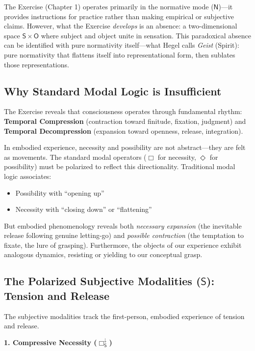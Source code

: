 \documentclass[12pt]{book}
\newcommand{\SBoxDown}{\Box_{\mathsf{S}}^{\downarrow}}
\begin{document}
The Exercise (Chapter 1) operates primarily in the normative mode ($\mathsf{N}$)---it provides instructions for practice rather than making empirical or subjective claims. However, what the Exercise \textit{develops} is an absence: a two-dimensional space $\mathsf{S} \times \mathsf{O}$ where subject and object unite in sensation. This paradoxical absence can be identified with pure normativity itself---what Hegel calls \textit{Geist} (Spirit): pure normativity that flattens itself into representational form, then sublates those representations.

\subsection{Why Standard Modal Logic is Insufficient}

The Exercise reveals that consciousness operates through fundamental rhythm: \textbf{Temporal Compression} (contraction toward finitude, fixation, judgment) and \textbf{Temporal Decompression} (expansion toward openness, release, integration).

In embodied experience, necessity and possibility are not abstract---they are felt as movements. The standard modal operators ($\Box$ for necessity, $\Diamond$ for possibility) must be polarized to reflect this directionality. Traditional modal logic associates:

\begin{itemize}
\item Possibility with ``opening up''
\item Necessity with ``closing down'' or ``flattening''
\end{itemize}

But embodied phenomenology reveals both \textit{necessary expansion} (the inevitable release following genuine letting-go) and \textit{possible contraction} (the temptation to fixate, the lure of grasping). Furthermore, the objects of our experience exhibit analogous dynamics, resisting or yielding to our conceptual grasp.

\subsection{The Polarized Subjective Modalities ($\mathsf{S}$): Tension and Release}

The subjective modalities track the first-person, embodied experience of tension and release.

\bigskip

\noindent\textbf{1. Compressive Necessity ($\SBoxDown$)}
\end{document}
